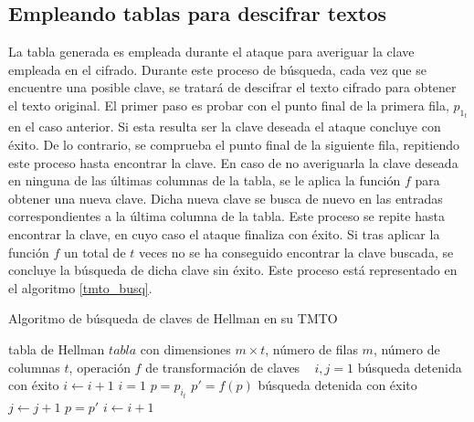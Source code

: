 \documentclass[12pt,spanish,listoffigures,listoftables,listofalgorithms]{tfgetsinf}
\begin{document}
\subsection{Empleando tablas para descifrar textos}

La tabla generada es empleada durante el ataque para averiguar la clave empleada en el cifrado. Durante este proceso de búsqueda, cada vez que se encuentre una posible clave, se tratará de descifrar el texto cifrado para obtener el texto original. El primer paso es probar con el punto final de la primera fila, $p_{1_t}$ en el caso anterior. Si esta resulta ser la clave deseada el ataque concluye con éxito. De lo contrario, se comprueba el punto final de la siguiente fila, repitiendo este proceso hasta encontrar la clave. En caso de no averiguarla la clave deseada en ninguna de las últimas columnas de la tabla, se le aplica la función $f$ para obtener una nueva clave. Dicha nueva clave se busca de nuevo en las entradas correspondientes a la última columna de la tabla. Este proceso se repite hasta encontrar la clave, en cuyo caso el ataque finaliza con éxito. Si tras aplicar la función $f$ un total de $t$ veces no se ha conseguido encontrar la clave buscada, se concluye la búsqueda de dicha clave sin éxito. Este proceso está representado en el algoritmo \ref{tmto_busq}.

\begin{algorithm}[H]
	\caption{Algoritmo de búsqueda de claves de Hellman en su TMTO}
	\label{tmto_busq}
	\begin{algorithmic}
		\REQUIRE tabla de Hellman $tabla$ con dimensiones $m \times t$, número de filas $m$, número de columnas $t$, operación $f$ de transformación de claves
		\STATE ~
		\STATE $i, j = 1$
				\STATE búsqueda detenida con éxito
			\ELSE
				\STATE $i \leftarrow i + 1$
			\ENDIF
		\ENDWHILE
		\STATE $i = 1$
			\STATE $p = p_{i_t}$
				\STATE $p' = f(p)$
					\STATE búsqueda detenida con éxito
				\ELSE
					\STATE $j \leftarrow j + 1$
					\STATE $p = p'$
				\ENDIF
			\ENDWHILE
			\STATE $i \leftarrow i + 1$
		\ENDWHILE
	\end{algorithmic}
\end{algorithm}

\end{document}
